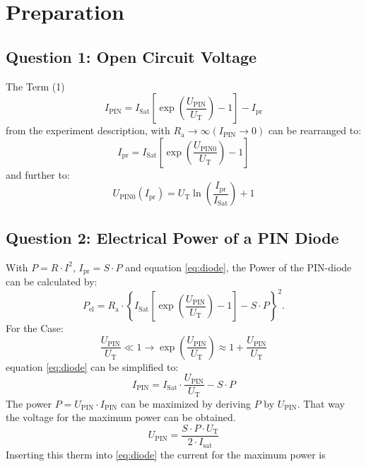 \chapter{Preparation}

\section{Question 1: Open Circuit Voltage}
The Term (1)
\begin{equation}
 I_{\mathrm{PIN}} = I_{\mathrm{Sat}}\left[\exp\left(\frac{U_{\mathrm{PIN}}}{U_{\mathrm{T}}}\right)-1\right] -I_{\mathrm{pr}}
\label{eq:diode}
\end{equation}
from the experiment description, with $R_{\mathrm{a}}\to\infty(I_{\mathrm{PIN}}\to0)$ can be rearranged to:
\begin{equation}
 I_{\mathrm{pr}} = I_{\mathrm{Sat}}\left[\exp\left(\frac{U_{\mathrm{PIN0}}}{U_{\mathrm{T}}}\right)-1\right]
\end{equation}
and further to:
\begin{equation}
 U_{\mathrm{PIN0}}(I_{\mathrm{pr}}) = U_{\mathrm{T}}\ln\left(\frac{I_{\mathrm{pr}}}{I_{\mathrm{Sat}}}\right)+1
\end{equation}

\section{Question 2: Electrical Power of a PIN Diode}

With $P = R\cdot I^2$, $I_{\mathrm{pr}} = S\cdot P$ and equation \eqref{eq:diode}, the Power of the PIN-diode can be calculated by:
\begin{equation}
 P_{\mathrm{el}} = R_{\mathrm{a}}\cdot\left\{ I_{\mathrm{Sat}}\left[\exp\left(\frac{U_{\mathrm{PIN}}}{U_{\mathrm{T}}}\right)-1\right] -S\cdot P\right\}^2.
\label{eq:power}
\end{equation}
For the Case:
\begin{equation}
 \frac{U_{\mathrm{PIN}}}{U_{\mathrm{T}}} \ll 1 \to \exp\left(\frac{U_{\mathrm{PIN}}}{U_{\mathrm{T}}}\right)\approx1+\frac{U_{\mathrm{PIN}}}{U_{\mathrm{T}}}
\label{eq:vereinfachung}
\end{equation}
equation \eqref{eq:diode} can be simplified to:
%
\begin{equation}
I_{\mathrm{PIN}} = I_{\mathrm{Sat}}\cdot\frac{U_{\mathrm{PIN}}}{U_{\mathrm{T}}} -S\cdot P
\label{eq:}
\end{equation}
The power $P = U_{\mathrm{PIN}} \cdot I_{\mathrm{PIN}}$ can be maximized  by deriving $P$ by $U_{\mathrm{PIN}}$. That way the voltage for the maximum power can be obtained. 
\begin{equation}
U_{\mathrm{PIN}} = \frac{S\cdot P \cdot U_{\mathrm{T}}}{2\cdot I_{\mathrm{sat}}} 
\label{eq:}
\end{equation}
Inserting this therm into \eqref{eq:diode} the current for the maximum power is

